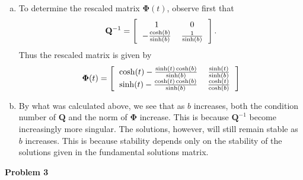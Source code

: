 \documentclass[a4paper, 12pt]{article}
\begin{document}
\begin{enumerate}[(a)]
	\item To determine the rescaled matrix $\mathbf{\Phi}(t)$, observe first that
	\[
		\mathbf{Q}^{-1} = 
		\left[
		\begin{tabular}{cc}
		1 & 0 \\
		$-\frac{\cosh(b)}{\sinh(b)}$ & $\frac{1}{\sinh(b)}$
		\end{tabular}
		\right].
	\]
	Thus the rescaled matrix is given by
	\[
		\mathbf{\Phi}(t) = 
		\left[
		\begin{tabular}{cc}
		$\cosh(t) - \frac{\sinh(t)\cosh(b)}{\sinh(b)}$ & $\frac{\sinh(t)}{\sinh(b)}$ \\
		$\sinh(t) - \frac{\cosh(t)\cosh(b)}{\sinh(b)}$ & $\frac{\cosh(t)}{\cosh(b)}$
		\end{tabular}
		\right]
	\]

	\item By what was calculated above, we see that as $b$ increases, both the condition number of $\mathbf{Q}$ and the norm of $\mathbf{\Phi}$ increase. This is because $\mathbf{Q}^{-1}$ become increasingly more singular. The solutions, however, will still remain stable as $b$ increases. This is because stability depends only on the stability of the solutions given in the fundamental solutions matrix.
\end{enumerate}
\newpage

\begin{center}
	\textbf{Problem 3}
\end{center}
\end{document}
